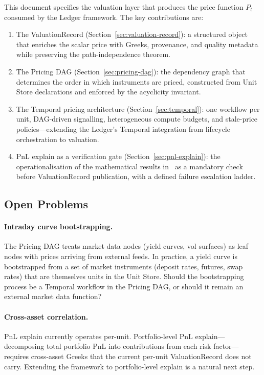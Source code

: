 \documentclass[11pt,a4paper]{article}
\begin{document}
This document specifies the valuation layer that produces the price function $P_t$ consumed by the Ledger framework.  The key contributions are:

\begin{enumerate}
\item The ValuationRecord (Section~\ref{sec:valuation-record}): a structured object that enriches the scalar price with Greeks, provenance, and quality metadata while preserving the path-independence theorem.

\item The Pricing DAG (Section~\ref{sec:pricing-dag}): the dependency graph that determines the order in which instruments are priced, constructed from Unit Store declarations and enforced by the acyclicity invariant.

\item The Temporal pricing architecture (Section~\ref{sec:temporal}): one workflow per unit, DAG-driven signalling, heterogeneous compute budgets, and stale-price policies---extending the Ledger's Temporal integration from lifecycle orchestration to valuation.

\item PnL explain as a verification gate (Section~\ref{sec:pnl-explain}): the operationalisation of the mathematical results in~\cite{pnl_explain} as a mandatory check before ValuationRecord publication, with a defined failure escalation ladder.
\end{enumerate}

\subsection{Open Problems}

\paragraph{Intraday curve bootstrapping.}  The Pricing DAG treats market data nodes (yield curves, vol surfaces) as leaf nodes with prices arriving from external feeds.  In practice, a yield curve is bootstrapped from a set of market instruments (deposit rates, futures, swap rates) that are themselves units in the Unit Store.  Should the bootstrapping process be a Temporal workflow in the Pricing DAG, or should it remain an external market data function?

\paragraph{Cross-asset correlation.}  PnL explain currently operates per-unit.  Portfolio-level PnL explain---decomposing total portfolio PnL into contributions from each risk factor---requires cross-asset Greeks that the current per-unit ValuationRecord does not carry.  Extending the framework to portfolio-level explain is a natural next step.
\end{document}
